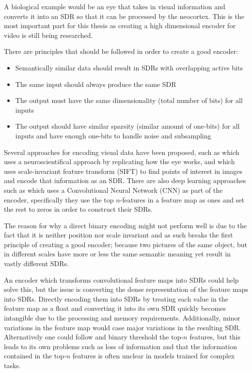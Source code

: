 A biological example would be an eye that takes in visual information and converts it into an SDR so that it can be processed by the neocortex. This is the most important part for this thesis as creating a high dimensional encoder for video is still being researched.\par
There are principles that should be followed in order to create a good encoder:
\begin{itemize}
    \item Semantically similar data should result in SDRs with overlapping active bits
    \item The same input should always produce the same SDR
    \item The output must have the same dimensionality (total number of bits) for all inputs
    \item The output should have similar sparsity (similar amount of one-bits) for all inputs and have enough one-bits to handle noise and subsampling
\end{itemize}
Several approaches for encoding visual data have been proposed, such as \cite{eyeencoder} which uses a neuroscientifical approach by replicating how the eye works, and \cite{ObjectDetectionSIFT} which uses scale-invariant feature transform (SIFT) to find points of interest in images and encode that information as an SDR. There are also deep learning approaches such as \cite{CNN_HTM} which uses a Convolutional Neural Network (CNN) as part of the encoder, specifically they use the top $n$-features in a feature map as ones and set the rest to zeros in order to construct their SDRs. \par
The reason for why a direct binary encoding might not perform well is due to the fact that it is neither position nor scale invariant and as such breaks the first principle of creating a good encoder; because two pictures of the same object, but in different scales have more or less the same semantic meaning yet result in vastly different SDRs.\par
An encoder which transforms convolutional feature maps into SDRs could help solve this, but the issue is converting the dense representation of the feature maps into SDRs. Directly encoding them into SDRs by treating each value in the feature map as a float and converting it into its own SDR quickly becomes intangible due to the processing and memory requirements. Additionally, minor variations in the feature map would case major variations in the resulting SDR. Alternatively one could follow \cite{CNN_HTM} and binary threshold the top-$n$ features, but this leads to its own problems such as loss of information and that the information contained in the top-$n$ features is often unclear in models trained for complex tasks.

